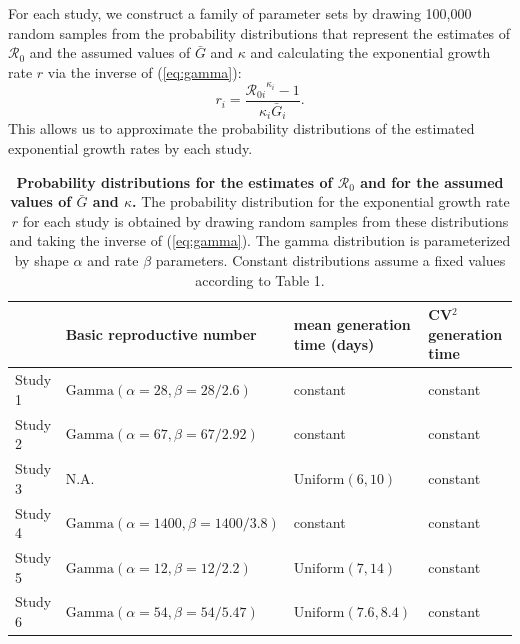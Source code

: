 \documentclass[12pt]{article}
\newcommand{\eref}[1]{(\ref{eq:#1})}
\begin{document}
For each study, we construct a family of parameter sets by drawing 100,000 random samples from the probability distributions that represent the estimates of $\mathcal R_0$ and the assumed values of $\bar G$ and $\kappa$
and calculating the exponential growth rate $r$ via the inverse of \eref{gamma}:
\begin{equation}
r_i = \frac{{\mathcal R_{0i}}^{\kappa_i} - 1}{\kappa_i \bar{G}_i}.
\end{equation}
This allows us to approximate the probability distributions of the estimated exponential growth rates by each study.

\begin{table}[t]
\begin{center}
\footnotesize
\begin{tabular}{l|l|l|l}
 & Basic reproductive number & mean generation time (days) & CV$^2$ generation time \\
\hline
Study 1 & $\mathrm{Gamma}(\alpha=28, \beta=28/2.6)$ & constant & constant \\
\hline
Study 2 & $\mathrm{Gamma}(\alpha=67, \beta=67/2.92)$ & constant & constant \\
\hline
Study 3 & N.A. & $\mathrm{Uniform}(6, 10)$ & constant\\
\hline
Study 4 & $\mathrm{Gamma}(\alpha=1400, \beta=1400/3.8)$ & constant & constant \\
\hline
Study 5 & $\mathrm{Gamma}(\alpha=12, \beta=12/2.2)$ & $\mathrm{Uniform}(7, 14)$ & constant\\
\hline
Study 6 & $\mathrm{Gamma}(\alpha=54, \beta=54/5.47)$ & $\mathrm{Uniform}(7.6, 8.4)$ & constant
\end{tabular}
\end{center}
\caption{
\textbf{Probability distributions for the estimates of $\mathcal R_0$ and for the assumed values of $\bar G$ and $\kappa$.}
The probability distribution for the exponential growth rate $r$ for each study is obtained by drawing random samples from these distributions and taking the inverse of \eref{gamma}.
The gamma distribution is parameterized by shape $\alpha$ and rate $\beta$ parameters.
Constant distributions assume a fixed values according to Table 1.
}
\end{table}
\end{document}
